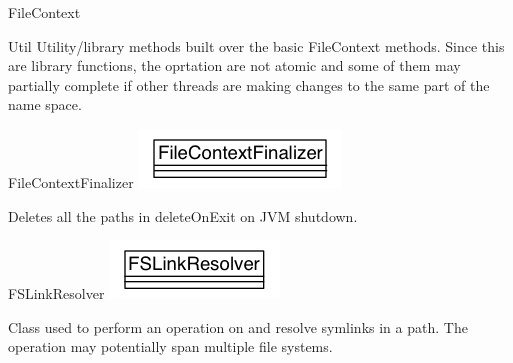 \begin{XeClass}{FileContext}
\begin{XeInnerClass}{Util}
 Utility/library methods built over the basic FileContext methods.
 Since this are library functions, the oprtation are not atomic
 and some of them may partially complete if other threads are making
 changes to the same part of the name space.

    \end{XeInnerClass}

    \begin{XeInnerClass}{FileContextFinalizer}
\includegraphics[width=\textwidth]{cdig/FileContextFinalizer.png}
         
 Deletes all the paths in deleteOnExit on JVM shutdown.

    \end{XeInnerClass}
    \begin{XeInnerClass}{FSLinkResolver}
\includegraphics[width=\textwidth]{cdig/FSLinkResolver.png}
         
 Class used to perform an operation on and resolve symlinks in a
 path. The operation may potentially span multiple file systems.

    \end{XeInnerClass}
\end{XeClass}
